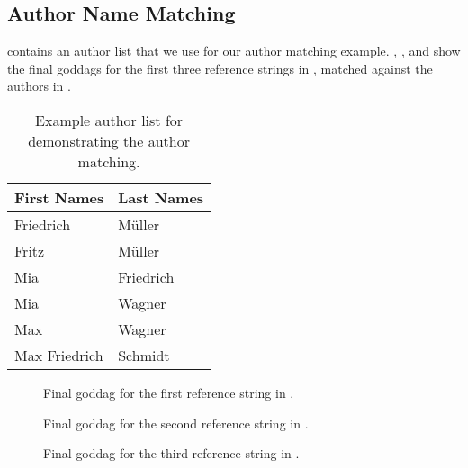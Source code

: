 \subsection{Author Name Matching}\label{app:author-name-matching}
 contains an author list that we use for our author matching example.
, , and  show the final \glspl{goddag} for the first three reference strings in , matched against the authors in .
\begin{table}[h]
\centering
\begin{tabular}{l l}
 \toprule
 First Names & Last Names\\
 \midrule
 Friedrich & Müller\\
 Fritz & Müller\\
 Mia & Friedrich\\
 Mia & Wagner\\
 Max & Wagner\\
 Max Friedrich & Schmidt\\
 \bottomrule
\end{tabular}
\caption{Example author list for demonstrating the author matching.}
\label{tab:example-author-list}
\end{table}
\begin{figure}[h]
  \centering
  
\caption{Final \gls{goddag} for the first reference string in .}
\label{fig:example-goddag-1-final}
\end{figure}
\begin{figure}[h]
  \centering
  
\caption{Final \gls{goddag} for the second reference string in .}
\label{fig:example-goddag-2-final}
\end{figure}
\begin{figure}[h]
  \centering
  
\caption{Final \gls{goddag} for the third reference string in .}
\label{fig:example-goddag-3-final}
\end{figure}

